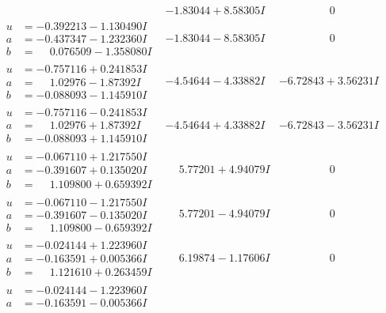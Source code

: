 \documentclass[1p]{elsarticle_modified}
\theoremstyle{definition}
\begin{document}
$$\begin{array}{c|c|c}
 & -1.83044 + 8.58305 I & \phantom{-0.000000 } 0 \\ \hline\begin{aligned}
u &= -0.392213 - 1.130490 I \\
a &= -0.437347 - 1.232360 I \\
b &= \phantom{-}0.076509 - 1.358080 I\end{aligned}
 & -1.83044 - 8.58305 I & \phantom{-0.000000 } 0 \\ \hline\begin{aligned}
u &= -0.757116 + 0.241853 I \\
a &= \phantom{-}1.02976 - 1.87392 I \\
b &= -0.088093 - 1.145910 I\end{aligned}
 & -4.54644 - 4.33882 I & -6.72843 + 3.56231 I \\ \hline\begin{aligned}
u &= -0.757116 - 0.241853 I \\
a &= \phantom{-}1.02976 + 1.87392 I \\
b &= -0.088093 + 1.145910 I\end{aligned}
 & -4.54644 + 4.33882 I & -6.72843 - 3.56231 I \\ \hline\begin{aligned}
u &= -0.067110 + 1.217550 I \\
a &= -0.391607 + 0.135020 I \\
b &= \phantom{-}1.109800 + 0.659392 I\end{aligned}
 & \phantom{-}5.77201 + 4.94079 I & \phantom{-0.000000 } 0 \\ \hline\begin{aligned}
u &= -0.067110 - 1.217550 I \\
a &= -0.391607 - 0.135020 I \\
b &= \phantom{-}1.109800 - 0.659392 I\end{aligned}
 & \phantom{-}5.77201 - 4.94079 I & \phantom{-0.000000 } 0 \\ \hline\begin{aligned}
u &= -0.024144 + 1.223960 I \\
a &= -0.163591 + 0.005366 I \\
b &= \phantom{-}1.121610 + 0.263459 I\end{aligned}
 & \phantom{-}6.19874 - 1.17606 I & \phantom{-0.000000 } 0 \\ \hline\begin{aligned}
u &= -0.024144 - 1.223960 I \\
a &= -0.163591 - 0.005366 I \\

\end{aligned}
\end{array}$$
\end{document}
